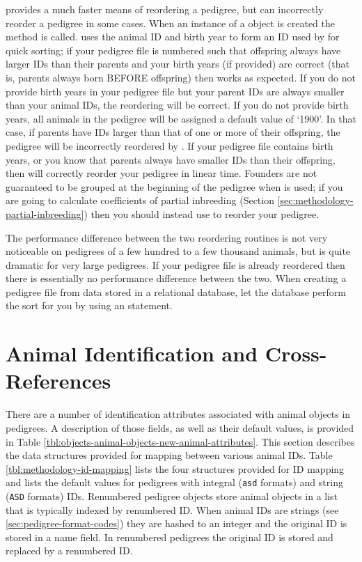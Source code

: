  provides a much faster means of reordering a pedigree, but can incorrectly reorder a pedigree in some cases.  When an instance of a  object is created the  method is called.   uses the animal ID and birth year to form an ID used by  for quick sorting; if your pedigree file is numbered such that offspring always have larger IDs than their parents and your birth years (if provided) are correct (that is, parents always born BEFORE offspring) then  works as expected.  If you do not provide birth years in your pedigree file but your parent IDs are always smaller than your animal IDs, the reordering will be correct.  If you do not provide birth years, all animals in the pedigree will be assigned a default value of `1900'.  In that case, if parents have IDs larger than that of one or more of their offspring, the pedigree will be incorrectly reordered by .  If your pedigree file contains birth years, or you know that parents always have smaller IDs than their offspring, then  will correctly reorder your pedigree in linear time. Founders
are not guaranteed to be grouped at the beginning of the pedigree when  is used; if you are going to calculate coefficients of
partial inbreeding (Section \ref{sec:methodology-partial-inbreeding}) then you should instead use  to reorder your pedigree.

The performance difference between the two reordering routines is not very noticeable on pedigrees of a few hundred to a few thousand animals, but is quite dramatic for very large pedigrees. If your pedigree file is already reordered then there is essentially no performance difference between the two. When creating a pedigree file from data stored in a relational database, let the database perform the sort for you by using an  statement.

\section{Animal Identification and Cross-References}
\label{sec:methodology-id-mapping}
There are a number of identification attributes associated with animal objects in \PyPedal{} pedigrees. A description of those fields, as well as their default values, is provided in Table \ref{tbl:objects-animal-objects-new-animal-attributes}. This section describes the data structures provided for mapping between various animal IDs. Table \ref{tbl:methodology-id-mapping} lists the four structures provided for ID mapping and lists the default values for pedigrees with integral (\texttt{asd} formats) and string (\texttt{ASD} formats) IDs. Renumbered \PyPedal{} pedigree objects store animal objects in a list that is typically indexed by renumbered ID. When animal IDs are strings (see \ref{sec:pedigree-format-codes}) they are hashed to an integer and the original ID is stored in a name field. In renumbered pedigrees the original ID is stored and replaced by a renumbered ID.

